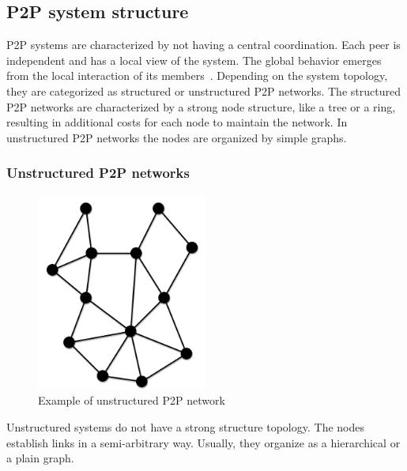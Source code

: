 \subsection{P2P system structure}
\label{sec:p2p_estructure}

P2P systems are characterized by not having a central coordination. Each
peer is independent and has a local view of the system. The global behavior
emerges from the local interaction of its members~\cite{Aberer:2001:PIS:503271.503268}.
Depending on the system topology, they are categorized as structured or
unstructured P2P networks. The structured P2P networks are characterized by a
strong node structure, like a tree or a ring, resulting in additional costs for
each node to maintain the network. In unstructured P2P networks the nodes are organized
by simple graphs.

\subsubsection{Unstructured P2P networks}
\label{sec:p2p_unstructured}

\begin{figure}
\center
\includegraphics[width=0.5\textwidth]{img/p2p-unstructured}
\caption{Example of unstructured P2P network}
\label{fig:p2p_unstructured}
\end{figure}

Unstructured systems do not have a strong structure topology. The nodes
establish links in a semi-arbitrary way. Usually, they organize as a hierarchical or a
plain graph.


